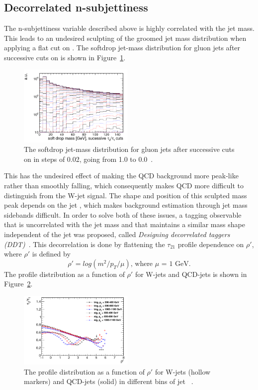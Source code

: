 \subsection{Decorrelated n-subjettiness}
\label{sec:objreco:ddt}
The n-subjettiness variable described above is highly correlated with the jet mass. This leads to an undesired sculpting of the groomed jet mass distribution when applying a flat cut on \nsubj. The softdrop jet-mass distribution for gluon jets after successive cuts on \nsubj is shown in Figure~\ref{fig:objreco:sculpt}.
\begin{figure}[h!] 
    \centering 
    \includegraphics[width=0.49\textwidth]{figures/event_reconstruction/sdmassvstau21.png}
     \caption{The softdrop jet-mass distribution for gluon jets after successive cuts on \nsubj in steps of 0.02, going from 1.0 to 0.0~\cite{Dolen:2016kst}.}
     \label{fig:objreco:sculpt}
 \end{figure}
This has the undesired effect of making the QCD background more peak-like rather than smoothly falling, which consequently makes QCD more difficult to distinguish from the W-jet signal. The shape and position of this sculpted mass peak depends on the jet \PT, which makes background estimation through jet mass sidebands difficult. In order to solve both of these issues, a tagging observable that is uncorrelated with the jet mass and that maintains a similar mass shape independent of the jet \PT was proposed, called \emph{Designing decorrelated taggers (DDT)}~\cite{Dolen:2016kst}. This decorrelation is done by flattening the $\tau_{21}$ profile dependence on $\rho'$, where $\rho'$ is defined by
\begin{equation}
\rho' = log(m^2/p_T/\mu) \textrm{, where $\mu$ = 1 GeV}.
\end{equation}
The \nsubj profile distribution as a function of $\rho'$ for W-jets and QCD-jets is shown in Figure~\ref{fig:objreco:tau21profileRho}.
\begin{figure}[h!] 
    \centering 
    \includegraphics[width=0.49\textwidth]{figures/event_reconstruction/rho_vs_tau21.png}
     \caption{The \nsubj profile distribution as a function of $\rho'$ for W-jets (hollow markers) and QCD-jets (solid) in different bins of jet \PT~\cite{Dolen:2016kst}.}
     \label{fig:objreco:tau21profileRho}
 \end{figure}
